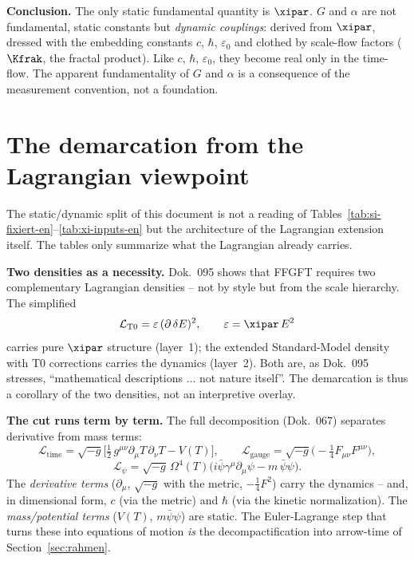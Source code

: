 \begin{result}
\textbf{Conclusion.} The only static fundamental quantity is $\xipar$. $G$ and
$\alpha$ are not fundamental, static constants but \emph{dynamic couplings}:
derived from $\xipar$, dressed with the embedding constants $c$, $\hbar$,
$\varepsilon_0$ and clothed by scale-flow factors ($\Kfrak$, the fractal product).
Like $c$, $\hbar$, $\varepsilon_0$, they become real only in the time-flow. The
apparent fundamentality of $G$ and $\alpha$ is a consequence of the measurement
convention, not a foundation.
\end{result}

\section{The demarcation from the Lagrangian viewpoint}

The static/dynamic split of this document is not a reading of
Tables~\ref{tab:si-fixiert-en}--\ref{tab:xi-inputs-en} but the architecture of the
Lagrangian extension itself. The tables only summarize what the Lagrangian already
carries.

\textbf{Two densities as a necessity.} Dok.~095 shows that FFGFT requires two
complementary Lagrangian densities -- not by style but from the scale hierarchy.
The simplified
\[
  \mathcal{L}_{\mathrm{T0}} = \varepsilon\,(\partial\,\delta E)^2,
  \qquad \varepsilon = \xipar\,E^2
\]
carries pure $\xipar$ structure (layer~1); the extended Standard-Model density with
T0 corrections carries the dynamics (layer~2). Both are, as Dok.~095 stresses,
``mathematical descriptions ... not nature itself''. The demarcation is thus a
corollary of the two densities, not an interpretive overlay.

\textbf{The cut runs term by term.} The full decomposition (Dok.~067) separates
derivative from mass terms:
\[
  \mathcal{L}_{\text{time}} = \sqrt{-g}\Big[\tfrac{1}{2}\,g^{\mu\nu}\partial_\mu T\,\partial_\nu T - V(T)\Big],
  \qquad
  \mathcal{L}_{\text{gauge}} = \sqrt{-g}\big(-\tfrac{1}{4}F_{\mu\nu}F^{\mu\nu}\big),
\]
\[
  \mathcal{L}_\psi = \sqrt{-g}\,\Omega^4(T)\big(i\bar\psi\gamma^\mu\partial_\mu\psi - m\,\bar\psi\psi\big).
\]
The \emph{derivative terms} ($\partial_\mu$, $\sqrt{-g}$ with the metric,
$-\tfrac14 F^2$) carry the dynamics -- and, in dimensional form, $c$ (via the
metric) and $\hbar$ (via the kinetic normalization). The \emph{mass/potential
terms} ($V(T)$, $m\bar\psi\psi$) are static. The Euler-Lagrange step that turns
these into equations of motion \emph{is} the decompactification into arrow-time of
Section~\ref{sec:rahmen}.

